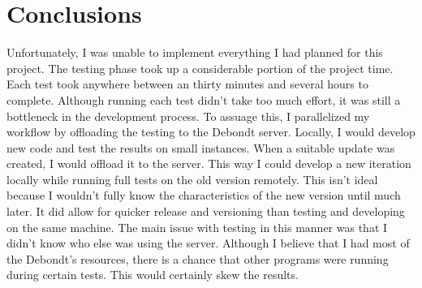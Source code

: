 \documentclass[10pt,letterpaper]{article}
\begin{document}


\section{Conclusions}
Unfortunately, I was unable to implement everything I had planned for this project. The testing phase took up a considerable portion of the project time. Each test took anywhere between an thirty minutes and several hours to complete. Although running each test didn't take too much effort, it was still a bottleneck in the development process. To assuage this, I parallelized my workflow by offloading the testing to the Debondt server. Locally, I would develop new code and test the results on small instances. When a suitable update was created, I would offload it to the server. This way I could develop a new iteration locally while running full tests on the old version remotely. This isn't ideal because I wouldn't fully know the characteristics of the new version until much later. It did allow for quicker release and versioning than testing and developing on the same machine. The main issue with testing in this manner was that I didn't know who else was using the server. Although I believe that I had most of the Debondt's resources, there is a chance that other programs were running during certain tests. This would certainly skew the results. 
\end{document}
